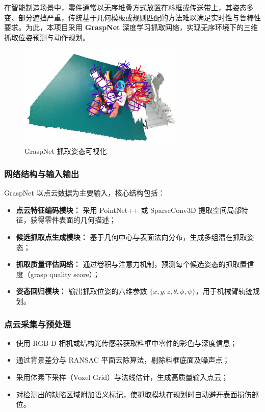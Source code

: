\documentclass{cumcmthesis}
\begin{document}
在智能制造场景中，零件通常以无序堆叠方式放置在料框或传送带上，其姿态多变、部分遮挡严重，传统基于几何模板或规则匹配的方法难以满足实时性与鲁棒性要求。为此，本项目采用 \textbf{GraspNet} 深度学习抓取网络，实现无序环境下的三维抓取位姿预测与动作规划。

\begin{figure}[htbp]\centering
\includegraphics[width=0.7\textwidth]{graspnet.png}
\caption{GraspNet 抓取姿态可视化}\label{fig:grasp_viz}
\end{figure}
\subsubsection{网络结构与输入输出}

GraspNet 以点云数据为主要输入，核心结构包括：
\begin{itemize}
    \item \textbf{点云特征编码模块：} 采用 PointNet++ \cite{qi2017pointnetplusplus} 或 SparseConv3D 提取空间局部特征，获得零件表面的几何描述；
    \item \textbf{候选抓取点生成模块：} 基于几何中心与表面法向分布，生成多组潜在抓取姿态；
    \item \textbf{抓取质量评估网络：} 通过卷积与注意力机制，预测每个候选姿态的抓取置信度（grasp quality score）；
    \item \textbf{姿态回归模块：} 输出抓取位姿的六维参数 $\{x, y, z, \theta, \phi, \psi\}$，用于机械臂轨迹规划。
\end{itemize}

\subsubsection{点云采集与预处理}

\begin{itemize}
    \item 使用 RGB-D 相机或结构光传感器获取料框中零件的彩色与深度信息；
    \item 通过背景差分与 RANSAC 平面去除算法，剔除料框底面及噪声点；
    \item 采用体素下采样（Voxel Grid）与法线估计，生成高质量输入点云；
    \item 对检测出的缺陷区域附加语义标记，使抓取模块在规划时自动避开表面损伤部位。
\end{itemize}
\end{document}
